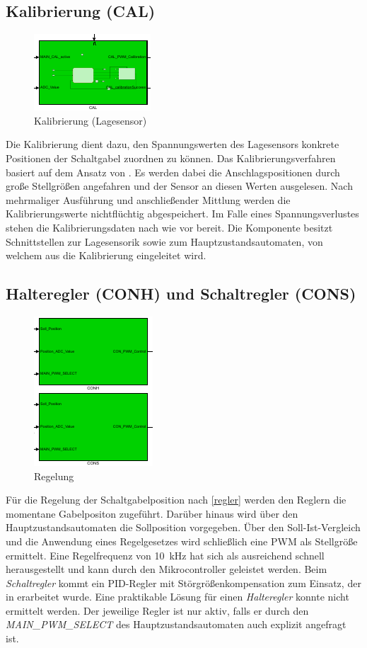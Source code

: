 \subsection{Kalibrierung (CAL)}

\begin{figure}[H]%
\centering
\includegraphics[width=0.3\columnwidth]{./Bilder/fig_cal}%
\caption{Kalibrierung (Lagesensor)}%
\label{fig_cal}%
\end{figure}

Die Kalibrierung dient dazu, den Spannungswerten des Lagesensors konkrete Positionen der Schaltgabel zuordnen zu können. Das Kalibrierungsverfahren basiert auf dem Ansatz von \cite{VorgaengerADP}. Es werden dabei die Anschlagspositionen durch große Stellgrößen angefahren und der Sensor an diesen Werten ausgelesen. Nach mehrmaliger Ausführung und anschließender Mittlung werden die Kalibrierungswerte nichtflüchtig abgespeichert. Im Falle eines Spannungsverlustes stehen die Kalibrierungsdaten nach wie vor bereit. Die Komponente besitzt Schnittstellen zur Lagesensorik sowie zum Hauptzustandsautomaten, von welchem aus die Kalibrierung eingeleitet wird.

\subsection{Halteregler (CONH) und Schaltregler (CONS)}

\begin{figure}[H]%
\centering
\includegraphics[width=0.2\columnwidth]{./Bilder/fig_conh_cons}%
\caption{Regelung}%
\label{fig_conh_cons}%
\end{figure}

Für die Regelung der Schaltgabelposition nach \autoref{regler} werden den Reglern die momentane Gabelpositon zugeführt. Darüber hinaus wird über den Hauptzustandsautomaten die Sollposition vorgegeben. Über den Soll-Ist-Vergleich und die Anwendung eines Regelgesetzes wird schließlich eine PWM als Stellgröße ermittelt. Eine Regelfrequenz von \SI{10}{kHz} hat sich als ausreichend schnell herausgestellt und kann durch den Mikrocontroller geleistet werden. Beim \textit{Schaltregler} kommt ein PID-Regler mit Störgrößenkompensation zum Einsatz, der in \cite{VorgaengerADP} erarbeitet wurde. Eine praktikable Lösung für einen \textit{Halteregler} konnte nicht ermittelt werden. Der jeweilige Regler ist nur aktiv, falls er durch den \textit{MAIN\_PWM\_SELECT} des Hauptzustandsautomaten auch explizit angefragt ist.
 
